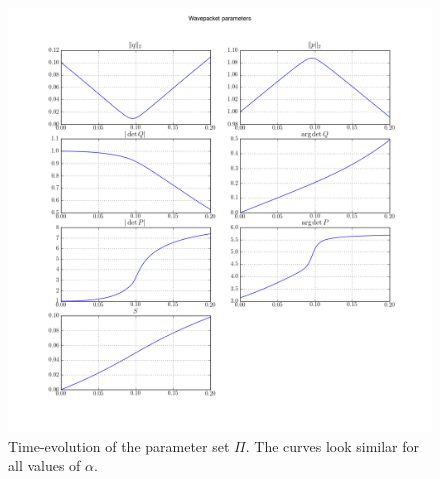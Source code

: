 \begin{figure}
  \centering
  \includegraphics[width=\linewidth]{./results/conic_missed/Parameters[bsize=16][alpha=1-0][eps=0-01]/wavepacket_parameters_abs_ang_block0.png}
  \caption[Time-evolution of the parameter set $\Pi$]{
    Time-evolution of the parameter set $\Pi$. The curves look similar for all values of $\alpha$.}
  \label{fig:conic_missed_pi_evolution}
\end{figure}


